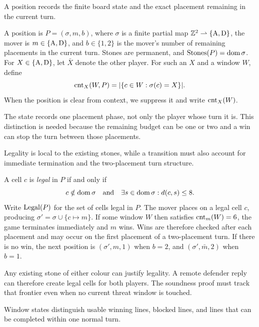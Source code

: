 A position records the finite board state and the exact placement remaining
in the current turn.

\begin{definition}[Positions]
\label{def:D3}
A position is $P=(\sigma,m,b)$, where $\sigma$ is a finite partial map
$\mathbb{Z}^{2}\rightharpoonup\{\mathrm{A},\mathrm{D}\}$, the mover is
$m\in\{\mathrm{A},\mathrm{D}\}$, and $b\in\{1,2\}$ is the mover's number of remaining
placements in the current turn.  Stones are permanent, and
$\operatorname{Stones}(P)=\operatorname{dom}\sigma$.  For $X\in\{\mathrm{A},\mathrm{D}\}$, let $\bar X$
denote the other player.  For such an $X$ and a window
$W$, define
\[
  \operatorname{cnt}_X(W,P)=|\{c\in W:\sigma(c)=X\}|.
\]
When the position is clear from context, we suppress it and write
$\operatorname{cnt}_X(W)$.
\end{definition}

\begin{plainterms}
The state records one placement phase, not only the player whose turn it is.
This distinction is needed because the remaining budget can be one or two and
a win can stop the turn between those placements.
\end{plainterms}

Legality is local to the existing stones, while a transition must also
account for immediate termination and the two-placement turn structure.

\begin{definition}
\label{def:D4}
A cell $c$ is \emph{legal} in $P$ if and only if
\[
  c\notin\operatorname{dom}\sigma
  \quad\text{and}\quad
  \exists s\in\operatorname{dom}\sigma:d(c,s)\le8.
\]
Write $\operatorname{Legal}(P)$ for the set of cells legal in $P$.
The mover places on a legal cell $c$, producing
$\sigma'=\sigma\cup\{c\mapsto m\}$.  If some window $W$ then satisfies
$\operatorname{cnt}_m(W)=6$, the game terminates immediately and $m$ wins.  Wins are
therefore checked after each placement and may occur on the first placement
of a two-placement turn.  If there is no win, the next position is
$ (\sigma',m,1)$ when $b=2$, and $(\sigma',\bar m,2)$ when $b=1$.
\end{definition}

\begin{plainterms}
Any existing stone of either colour can justify legality.  A remote defender
reply can therefore create legal cells for both players.  The soundness proof
must track that frontier even when no current threat window is touched.
\end{plainterms}

Window states distinguish usable winning lines, blocked lines, and lines that
can be completed within one normal turn.

